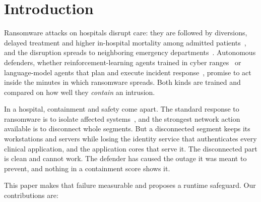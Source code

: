 \documentclass[conference,compsoc]{IEEEtran}
\begin{document}
\section{Introduction}

Ransomware attacks on hospitals disrupt care: they are followed by
diversions, delayed treatment and higher in-hospital mortality among
admitted patients~\cite{neprash2022,neprash2026}, and the disruption
spreads to neighboring emergency departments~\cite{dameff2023,abouk2024,pham2024}.
Autonomous defenders, whether reinforcement-learning agents trained in
cyber ranges~\cite{standen2021,cage4,cyberbattlesim} or language-model
agents that plan and execute incident response~\cite{castro2025}, promise
to act inside the minutes in which ransomware spreads. Both kinds are
trained and compared on how well they \emph{contain} an intrusion.

In a hospital, containment and safety come apart. The standard response
to ransomware is to isolate affected systems~\cite{cisa2023}, and the
strongest network action available is to disconnect whole segments. But a
disconnected segment keeps its workstations and servers while losing the
identity service that authenticates every clinical application, and the
application cores that serve it. The disconnected part is clean and cannot
work. The defender has caused the outage it was meant to prevent, and
nothing in a containment score shows it.

This paper makes that failure measurable and proposes a runtime safeguard.
Our contributions are:
\end{document}
